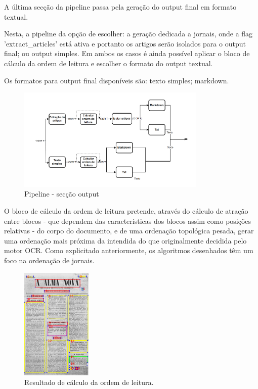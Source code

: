 A última secção da pipeline passa pela geração do output final em formato textual. 

Nesta, a pipeline da opção de escolher: a geração dedicada a jornais, onde a flag 'extract\_articles' está ativa e portanto os artigos serão isolados para o output final; ou output simples. Em ambos os casos é ainda possível aplicar o bloco de cálculo da ordem de leitura e escolher o formato do output textual.

Os formatos para output final disponíveis são: texto simples; markdown.

\begin{figure}[H]
	\centering
	\includegraphics[width=0.8\textwidth]{images/diagramas/arquitetura_pipeline_output.png}
	\caption{Pipeline - secção output}
	\label{fig:arquitetura_pipeline_output}
\end{figure}




O bloco de cálculo da ordem de leitura pretende, através do cálculo de atração entre blocos - que dependem das características dos blocos assim como posições relativas - do corpo do documento, e de uma ordenação topológica pesada, gerar uma ordenação mais próxima da intendida do que originalmente decidida pelo motor OCR. Como explicitado anteriormente, os algoritmos desenhados têm um foco na ordenação de jornais.


\begin{figure}[H]
	\centering
	\includegraphics[width=0.3\textwidth]{images/ilustracoes/pipeline_calculate_reading_order_example.png}
	\caption{Resultado de cálculo da ordem de leitura.}
	\label{fig:pipeline_calculate_reading_order_example}
\end{figure}

